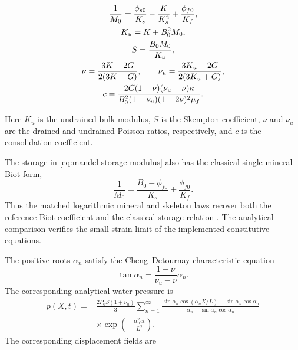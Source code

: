 
 \begin{gather}
  \frac{1}{M_0}
  =\frac{\phi_{s0}}{K_s}-\frac{K}{K_s^2}+\frac{\phi_{f0}}{K_f},
  \label{eq:mandel-storage-modulus}\\
  K_u=K+B_0^2M_0,
  \notag
\\
  S=\frac{B_0M_0}{K_u},
  \notag
\\
  \nu=\frac{3K-2G}{2(3K+G)},
  \qquad
  \nu_u=\frac{3K_u-2G}{2(3K_u+G)},
  \notag
\\
  c=\frac{
   2G(1-\nu)(\nu_u-\nu)\kappa
  }{
   B_0^2(1-\nu_u)(1-2\nu)^2\mu_f
  }.
  \notag
 \end{gather}

Here \(K_u\) is the undrained bulk modulus, \(S\) is the Skempton
coefficient, \(\nu\) and \(\nu_u\) are the drained and undrained Poisson
ratios, respectively, and \(c\) is the consolidation coefficient.

The storage in \eqref{eq:mandel-storage-modulus} also has the classical
single-mineral Biot form,
\begin{equation*}
 \frac{1}{M_0}
 =\frac{B_0-\phi_{f0}}{K_s}+\frac{\phi_{f0}}{K_f}.
\end{equation*}
Thus the matched logarithmic mineral and skeleton laws recover both the
reference Biot coefficient and the classical storage relation
\citep{biotwillis1957}.  The analytical comparison verifies the small-strain
limit of the implemented constitutive equations.

The positive roots \(\alpha_n\) satisfy the Cheng--Detournay characteristic
equation \citep{chengdetournay1988}
\begin{equation*}
 \tan\alpha_n
 =\frac{1-\nu}{\nu_u-\nu}\alpha_n.
\end{equation*}
The corresponding analytical water pressure is
\citep{chengdetournay1988}
\begin{align*}
 p(X,t)
 ={}&\frac{2P_0S(1+\nu_u)}{3}
 \sum_{n=1}^{\infty}
 \frac{
  \sin\alpha_n\cos\left(\alpha_n X/L\right)
  -\sin\alpha_n\cos\alpha_n
 }{
  \alpha_n-\sin\alpha_n\cos\alpha_n
 }
 \\
 &\mathbin{\times}
 \exp\left(-\frac{\alpha_n^2ct}{L^2}\right).
\end{align*}
The corresponding displacement fields are \citep{chengdetournay1988}

